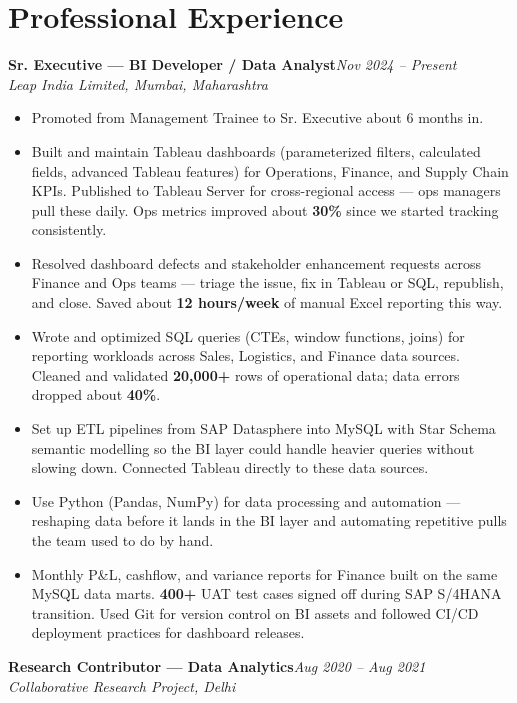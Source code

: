 \documentclass[10pt, letterpaper]{article}
\newcommand{\role}[3]{%
  \vspace{2pt}%
  {\bfseries #1}\hfill{\small\color{muted}\textit{#3}}\\[-2pt]%
  {\small\color{muted}\textit{#2}}%
}
\begin{document}
\section{Professional Experience}

\role{Sr. Executive --- BI Developer / Data Analyst}{Leap India Limited, Mumbai, Maharashtra}{Nov 2024 -- Present}

\begin{itemize}
  \item Promoted from Management Trainee to Sr. Executive about 6 months in.
  \item Built and maintain Tableau dashboards (parameterized filters, calculated fields, advanced Tableau features) for Operations, Finance, and Supply Chain KPIs. Published to Tableau Server for cross-regional access --- ops managers pull these daily. Ops metrics improved about \textbf{30\%} since we started tracking consistently.
  \item Resolved dashboard defects and stakeholder enhancement requests across Finance and Ops teams --- triage the issue, fix in Tableau or SQL, republish, and close. Saved about \textbf{12 hours/week} of manual Excel reporting this way.
  \item Wrote and optimized SQL queries (CTEs, window functions, joins) for reporting workloads across Sales, Logistics, and Finance data sources. Cleaned and validated \textbf{20,000+} rows of operational data; data errors dropped about \textbf{40\%}.
  \item Set up ETL pipelines from SAP Datasphere into MySQL with Star Schema semantic modelling so the BI layer could handle heavier queries without slowing down. Connected Tableau directly to these data sources.
  \item Use Python (Pandas, NumPy) for data processing and automation --- reshaping data before it lands in the BI layer and automating repetitive pulls the team used to do by hand.
  \item Monthly P\&L, cashflow, and variance reports for Finance built on the same MySQL data marts. \textbf{400+} UAT test cases signed off during SAP S/4HANA transition. Used Git for version control on BI assets and followed CI/CD deployment practices for dashboard releases.
\end{itemize}

\vspace{1pt}

\role{Research Contributor --- Data Analytics}{Collaborative Research Project, Delhi}{Aug 2020 -- Aug 2021}
\end{document}
